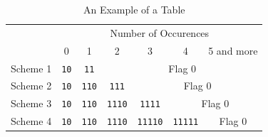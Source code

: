 \documentclass{article}
\begin{document}
\begin{table}[t]
   \centering
   \renewcommand{\arraystretch}{1.2}
   \caption{An Example of a Table}
   \label{Tbl:Example}
   \footnotesize
   \begin{tabular}{c|c|c|c|c|c|c}
\hline\hline
        & \multicolumn{6}{c}{Number of Occurences} \\\cline{2-7}
        & 0 & 1 & 2 & 3 & 4 & 5 and more \\\hline
Scheme 1&\texttt{10}&\texttt{11} &\multicolumn{4}{c}{\scriptsize Flag 0} \\\hline
Scheme 2&\texttt{10}&\texttt{110}&\texttt{111} &\multicolumn{3}{c}{\scriptsize Flag 0}\\\hline
Scheme 3&\texttt{10}&\texttt{110}&\texttt{1110}&\texttt{1111} &\multicolumn{2}{c}{\scriptsize Flag 0} \\\hline
Scheme 4&\texttt{10}&\texttt{110}&\texttt{1110}&\texttt{11110}&\texttt{11111}&{\scriptsize Flag 0}\\\hline
\hline
   \end{tabular}
\end{table}
\end{document}
